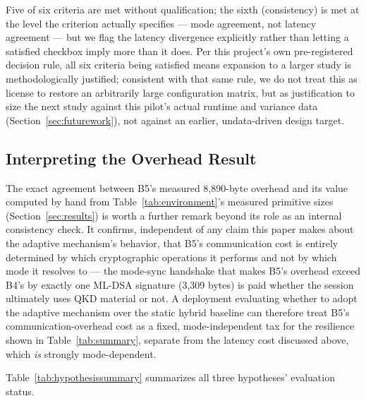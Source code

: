 \documentclass[journal]{IEEEtran}
\begin{document}
Five of six criteria are met without qualification; the sixth (consistency) is met at the level the criterion actually specifies --- mode agreement, not latency agreement --- but we flag the latency divergence explicitly rather than letting a satisfied checkbox imply more than it does. Per this project's own pre-registered decision rule, all six criteria being satisfied means expansion to a larger study is methodologically justified; consistent with that same rule, we do not treat this as license to restore an arbitrarily large configuration matrix, but as justification to size the next study against this pilot's actual runtime and variance data (Section~\ref{sec:futurework}), not against an earlier, undata-driven design target.

\subsection{Interpreting the Overhead Result}

The exact agreement between B5's measured 8{,}890-byte overhead and its value computed by hand from Table~\ref{tab:environment}'s measured primitive sizes (Section~\ref{sec:results}) is worth a further remark beyond its role as an internal consistency check. It confirms, independent of any claim this paper makes about the adaptive mechanism's behavior, that B5's communication cost is entirely determined by which cryptographic operations it performs and not by which mode it resolves to --- the mode-sync handshake that makes B5's overhead exceed B4's by exactly one ML-DSA signature (3{,}309 bytes) is paid whether the session ultimately uses QKD material or not. A deployment evaluating whether to adopt the adaptive mechanism over the static hybrid baseline can therefore treat B5's communication-overhead cost as a fixed, mode-independent tax for the resilience shown in Table~\ref{tab:summary}, separate from the latency cost discussed above, which \emph{is} strongly mode-dependent.

Table~\ref{tab:hypothesissummary} summarizes all three hypotheses' evaluation status.
\end{document}

